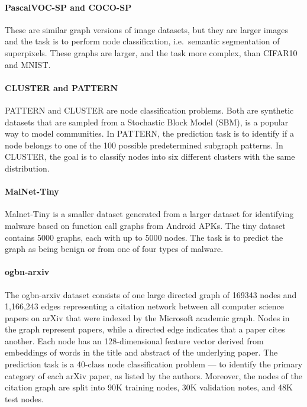 \documentclass{article}
\theoremstyle{plain}
\theoremstyle{definition}
\theoremstyle{remark}
\begin{document}
\paragraph{PascalVOC-SP and COCO-SP} \citep{dwivedi2021graph}
These are similar graph versions of image datasets, but they are larger images and the task is to perform node classification, i.e.\ semantic segmentation of superpixels.
These graphs are larger, and the task more complex, than CIFAR10 and MNIST.

\paragraph{CLUSTER and PATTERN} \citep{DwivediJLBB20}
PATTERN and CLUSTER are node classification problems. Both are synthetic datasets that are sampled from a Stochastic Block Model (SBM), is a popular way to model communities. In PATTERN, the prediction task is to identify if a node belongs to one of the 100 possible predetermined subgraph patterns.  In CLUSTER, the goal is to classify nodes into six different clusters with the same distribution.

\paragraph{MalNet-Tiny} \citep{FreitasDNC21}
Malnet-Tiny is a smaller dataset generated from a larger dataset for identifying malware based on function call graphs from Android APKs. The tiny dataset contains 5000 graphs, each with up to 5000 nodes. The task is to predict the graph as being benign or from one of four types of malware.





\paragraph{ogbn-arxiv} \citep{ogbPaper}
The ogbn-arxiv dataset consists of one large
directed graph of 169343 nodes and 1,166,243 edges representing a citation network between all
computer science papers on arXiv that were indexed by the
Microsoft academic graph. Nodes in the graph represent
papers, while a directed edge indicates that a paper cites
another. Each node has an 128-dimensional feature vector
derived from embeddings of words in the title and abstract
of the underlying paper. The prediction task is a 40-class
node classification problem --- to identify the primary
category of each arXiv paper, as listed by the authors.
Moreover, the nodes of the citation graph are split into
90K training nodes, 30K validation notes, and  48K test nodes.
\end{document}
